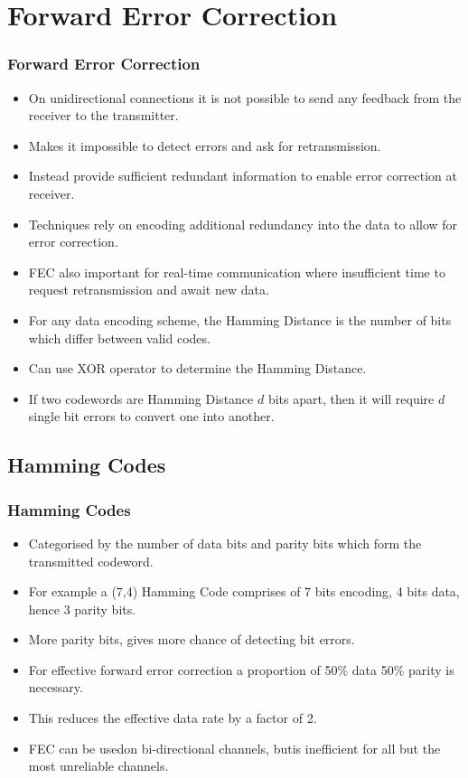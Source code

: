 \documentclass{beamer}
\begin{document}
\section{Forward Error Correction}
\begin{frame}
\frametitle{Forward Error Correction}
\begin{itemize}
\item On unidirectional connections it is not possible to send any feedback from the receiver to the transmitter.
\item Makes it impossible to detect errors and ask for retransmission.
\item Instead provide sufficient redundant information to enable error correction at receiver.
\item Techniques rely on encoding additional redundancy into the data to allow for error correction.
\item FEC also important for real-time communication where insufficient time to request retransmission and await new data.
\item For any data encoding scheme, the {\color{red}Hamming Distance} is the number of bits which differ between valid codes.
\item Can use XOR operator to determine the Hamming Distance. 
\item If two codewords are Hamming Distance $d$ bits apart, then it will require $d$ single bit errors to convert one into another.
\end{itemize}
\end{frame}
\subsection{Hamming Codes}
\begin{frame}
\frametitle{Hamming Codes}
\begin{itemize}
\item Categorised by the number of data bits and parity bits which form the transmitted codeword.
\item For example a (7,4) Hamming Code comprises of 7 bits encoding, 4 bits data, hence 3 parity bits.
\item More parity bits, gives more chance of detecting bit errors.
\item For effective forward error correction a proportion of 50\% data 50\% parity is necessary.
\item This reduces the effective data rate by a factor of 2.
\item FEC can be usedon bi-directional channels, butis inefficient for all but the most unreliable channels.
\end{itemize}
\end{frame}
\end{document}
